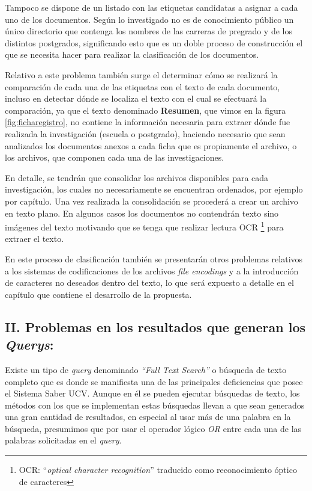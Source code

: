 \documentclass[
  10,
  spanish,
  openany]{book}
\begin{document}
Tampoco se dispone de un listado con las etiquetas candidatas a asignar a cada uno de los documentos. Según lo investigado no es de conocimiento público un único directorio que contenga los nombres de las carreras de pregrado y de los distintos postgrados, significando esto que es un doble proceso de construcción el que se necesita hacer para realizar la clasificación de los documentos.

Relativo a este problema también surge el determinar cómo se realizará la comparación de cada una de las etiquetas con el texto de cada documento, incluso en detectar dónde se localiza el texto con el cual se efectuará la comparación, ya que el texto denominado \textbf{Resumen}, que vimos en la figura \ref{fig:ficharegistro}, no contiene la información necesaria para extraer dónde fue realizada la investigación (escuela o postgrado), haciendo necesario que sean analizados los documentos anexos a cada ficha que es propiamente el archivo, o los archivos, que componen cada una de las investigaciones.

En detalle, se tendrán que consolidar los archivos disponibles para cada investigación, los cuales no necesariamente se encuentran ordenados, por ejemplo por capítulo. Una vez realizada la consolidación se procederá a crear un archivo en texto plano. En algunos casos los documentos no contendrán texto sino imágenes del texto motivando que se tenga que realizar lectura OCR \footnote{OCR: ``\emph{optical character recognition}'' traducido como reconocimiento óptico de caracteres} para extraer el texto.

En este proceso de clasificación también se presentarán otros problemas relativos a los sistemas de codificaciones de los archivos \emph{file encodings} y a la introducción de caracteres no deseados dentro del texto, lo que será expuesto a detalle en el capítulo que contiene el desarrollo de la propuesta.

\hypertarget{p2}{%
\subsection{\texorpdfstring{II. Problemas en los resultados que generan los \textbf{\emph{Querys}}:}{II. Problemas en los resultados que generan los Querys:}}\label{p2}}

Existe un tipo de \emph{query} denominado \emph{``Full Text Search''} o búsqueda de texto completo que es donde se manifiesta una de las principales deficiencias que posee el Sistema Saber UCV. Aunque en él se pueden ejecutar búsquedas de texto, los métodos con los que se implementan estas búsquedas llevan a que sean generados una gran cantidad de resultados, en especial al usar más de una palabra en la búsqueda, presumimos que por usar el operador lógico \emph{OR} entre cada una de las palabras solicitadas en el \emph{query}.
\end{document}
